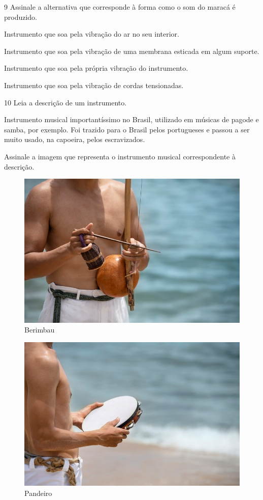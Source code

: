 \num{9}  Assinale a alternativa que corresponde à forma como o som do maracá é produzido.

\begin{boxlist}
 Instrumento que soa pela vibração do ar no seu interior.

 Instrumento que soa pela vibração de uma membrana esticada em algum suporte.

 Instrumento que soa pela própria vibração do instrumento.

 Instrumento que soa pela vibração de cordas tensionadas.
\end{boxlist}


\num{10} Leia a descrição de um instrumento.

Instrumento musical importantíssimo no Brasil, utilizado em músicas
de pagode e samba, por exemplo. Foi trazido para o Brasil pelos portugueses
e passou a ser muito usado, na capoeira, pelos escravizados.

Assinale a imagem que representa o instrumento musical correspondente à descrição.


\begin{figure}[htpb!]
\acima{( )}
\includegraphics[width=.5\textwidth]{./imgs/art19a.jpg}
\caption{Berimbau}
\end{figure}
\begin{figure}[htpb!]
\includegraphics[width=.5\textwidth]{./imgs/art19b.jpg}
\caption{Pandeiro}
\end{figure}

